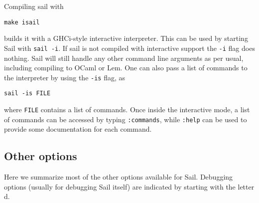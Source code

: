 Compiling sail with
\begin{verbatim}
make isail
\end{verbatim}
builds it with a GHCi-style interactive interpreter. This can be used
by starting Sail with \verb+sail -i+. If sail is not compiled with
interactive support the \verb+-i+ flag does nothing. Sail will still
handle any other command line arguments as per usual, including
compiling to OCaml or Lem. One can also pass a list of commands to the
interpreter by using the \verb+-is+ flag, as
\begin{verbatim}
sail -is FILE
\end{verbatim}
where \verb+FILE+ contains a list of commands. Once inside the interactive
mode, a list of commands can be accessed by typing \verb+:commands+,
while \verb+:help+ can be used to provide some documentation for each
command.

\subsection{Other options}

Here we summarize most of the other options available for
Sail. Debugging options (usually for debugging Sail itself) are
indicated by starting with the letter d.

